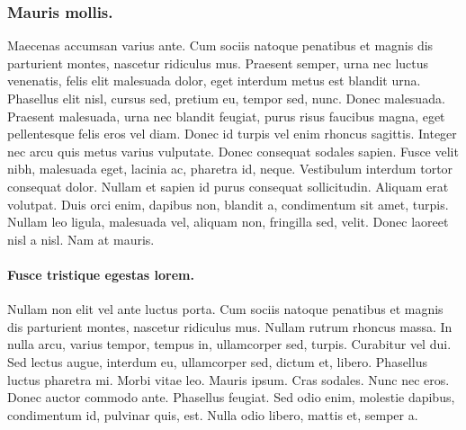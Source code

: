 \subsubsection{Mauris mollis.}
Maecenas accumsan varius ante. Cum sociis natoque penatibus et magnis dis parturient montes, nascetur ridiculus mus. Praesent semper, urna nec luctus venenatis, felis elit malesuada dolor, eget interdum metus est blandit urna. Phasellus elit nisl, cursus sed, pretium eu, tempor sed, nunc. Donec malesuada. Praesent malesuada, urna nec blandit feugiat, purus risus faucibus magna, eget pellentesque felis eros vel diam. Donec id turpis vel enim rhoncus sagittis. Integer nec arcu quis metus varius vulputate. Donec consequat sodales sapien. Fusce velit nibh, malesuada eget, lacinia ac, pharetra id, neque. Vestibulum interdum tortor consequat dolor. Nullam et sapien id purus consequat sollicitudin. Aliquam erat volutpat. Duis orci enim, dapibus non, blandit a, condimentum sit amet, turpis. Nullam leo ligula, malesuada vel, aliquam non, fringilla sed, velit. Donec laoreet nisl a nisl. Nam at mauris.

\paragraph{Fusce tristique egestas lorem.} Nullam non elit vel ante luctus porta. Cum sociis natoque penatibus et magnis dis parturient montes, nascetur ridiculus mus. Nullam rutrum rhoncus massa. In nulla arcu, varius tempor, tempus in, ullamcorper sed, turpis. Curabitur vel dui. Sed lectus augue, interdum eu, ullamcorper sed, dictum et, libero. Phasellus luctus pharetra mi. Morbi vitae leo. Mauris ipsum. Cras sodales. Nunc nec eros. Donec auctor commodo ante. Phasellus feugiat. Sed odio enim, molestie dapibus, condimentum id, pulvinar quis, est. Nulla odio libero, mattis et, semper a.
